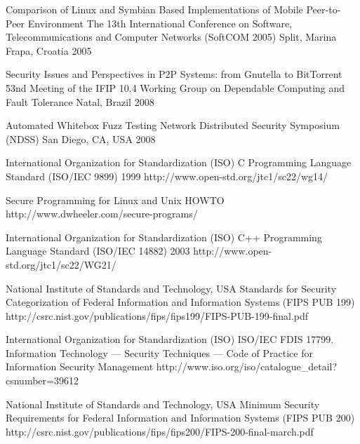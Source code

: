 \begin{thebibliography}{9}
		{
			\biband
			\biband
			}
		{Comparison of {L}inux and {S}ymbian Based Implementations of Mobile Peer-to-Peer Environment}
		{The 13th International Conference on Software, Telecommunications and Computer Networks ({SoftCOM} 2005)}
		{Split, Marina Frapa, Croatia}
		{2005}
	
		{}
		{Security Issues and Perspectives in P2P Systems: from Gnutella to BitTorrent}
		{53nd Meeting of the IFIP 10.4 Working Group on Dependable Computing and Fault Tolerance}
		{Natal, Brazil}
		{2008}
	
		{
			\biband
			\biband
			}
		{Automated Whitebox Fuzz Testing}
		{Network Distributed Security Symposium ({NDSS})}
		{San Diego, CA, USA}
		{2008}


		{International Organization for Standardization (ISO)}
		{{C} Programming Language Standard ({ISO/IEC} 9899)}
		{1999}
		{http://www.open-std.org/jtc1/sc22/wg14/}
		
		{}
		{Secure Programming for {L}inux and {U}nix {HOWTO}}
		{}
		{http://www.dwheeler.com/secure-programs/}
		
		{International Organization for Standardization (ISO)}
		{{C++} Programming Language Standard ({ISO/IEC} 14882)}
		{2003}
		{http://www.open-std.org/jtc1/sc22/WG21/}
		
		{National Institute of Standards and Technology, USA}
		{Standards for Security Categorization of Federal Information and Information Systems ({FIPS PUB} 199)}
		{}
		{http://csrc.nist.gov/publications/fips/fips199/FIPS-PUB-199-final.pdf}
		
		{International Organization for Standardization (ISO)}
		{ISO/IEC FDIS 17799. Information Technology — Security Techniques — Code of Practice for Information Security Management}
		{}
		{http://www.iso.org/iso/catalogue_detail?csnumber=39612}
	
		{National Institute of Standards and Technology, USA}
		{Minimum Security Requirements for Federal Information and Information Systems ({FIPS PUB} 200)}
		{}
		{http://csrc.nist.gov/publications/fips/fips200/FIPS-200-final-march.pdf}
	

\end{thebibliography}
